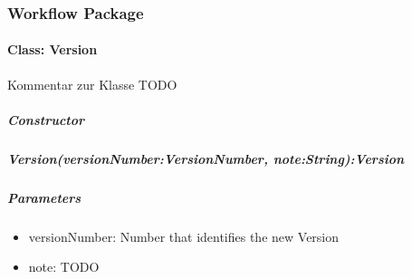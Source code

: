 \subsubsection{Workflow Package}

\paragraph{Class: Version}
Kommentar zur Klasse TODO
\subparagraph{Constructor}

\subparagraph{Version(versionNumber:VersionNumber, note:String):Version}

\subparagraph{Parameters}
\begin{itemize}
	\item{versionNumber:}
	Number that identifies the new Version
	\item{note:}
	TODO
\end{itemize}

